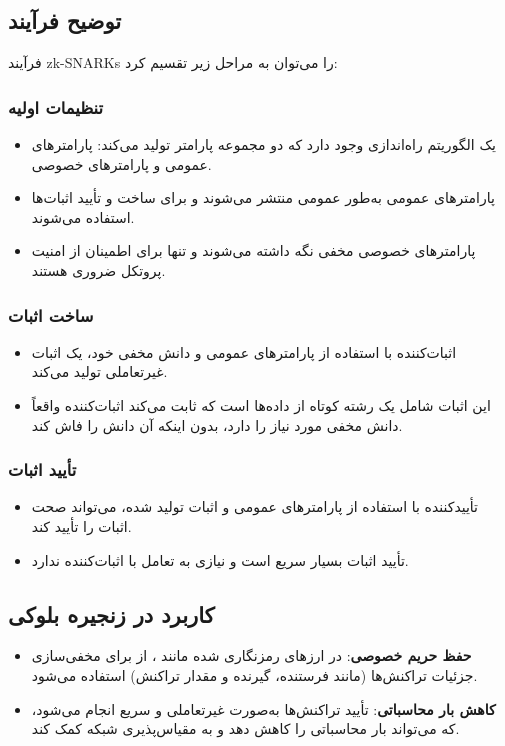 \documentclass{report}
\begin{document}
\subsection*{توضیح فرآیند}
فرآیند zk-SNARKs را می‌توان به مراحل زیر تقسیم کرد:

\subsubsection*{تنظیمات اولیه }
\begin{itemize}
    \item یک الگوریتم راه‌اندازی وجود دارد که دو مجموعه پارامتر تولید می‌کند: پارامترهای عمومی و پارامترهای خصوصی.
    \item پارامترهای عمومی به‌طور عمومی منتشر می‌شوند و برای ساخت و تأیید اثبات‌ها استفاده می‌شوند.
    \item پارامترهای خصوصی مخفی نگه داشته می‌شوند و تنها برای اطمینان از امنیت پروتکل ضروری هستند.
\end{itemize}

\subsubsection*{ساخت اثبات }
\begin{itemize}
    \item اثبات‌کننده با استفاده از پارامترهای عمومی و دانش مخفی خود، یک اثبات غیرتعاملی تولید می‌کند.
    \item این اثبات شامل یک رشته کوتاه از داده‌ها است که ثابت می‌کند اثبات‌کننده واقعاً دانش مخفی مورد نیاز را دارد، بدون اینکه آن دانش را فاش کند.
\end{itemize}

\subsubsection*{تأیید اثبات }
\begin{itemize}
    \item تأییدکننده با استفاده از پارامترهای عمومی و اثبات تولید شده، می‌تواند صحت اثبات را تأیید کند.
    \item تأیید اثبات بسیار سریع است و نیازی به تعامل با اثبات‌کننده ندارد.
\end{itemize}

\subsection*{کاربرد در زنجیره بلوکی}
\begin{itemize}
    \item \textbf{حفظ حریم خصوصی}:
     در ارزهای رمزنگاری شده مانند ، از  برای مخفی‌سازی جزئیات تراکنش‌ها (مانند فرستنده، گیرنده و مقدار تراکنش) استفاده می‌شود.
    \item \textbf{کاهش بار محاسباتی}:
     تأیید تراکنش‌ها به‌صورت غیرتعاملی و سریع انجام می‌شود، که می‌تواند بار محاسباتی را کاهش دهد و به مقیاس‌پذیری شبکه کمک کند.
\end{itemize}
\end{document}
